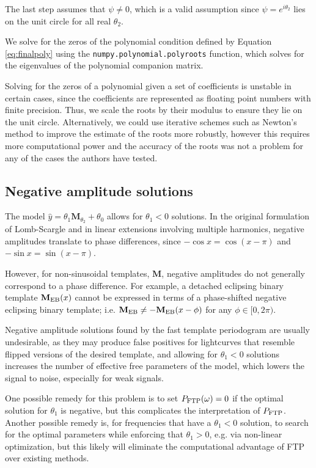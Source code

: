 \documentclass{aastex62}
\newcommand{\Mshft}{\mathbf{M}_{\theta_2}}
\newcommand{\eith}{\psi}
\begin{document}
The last step assumes that $\eith\ne 0$, which is a valid assumption since $\eith=e^{i\theta_2}$ lies on the
unit circle for all real $\theta_2$.

We solve for the zeros of the polynomial condition defined by Equation \ref{eq:finalpoly}
using the \texttt{numpy.polynomial.polyroots} function, which solves for the eigenvalues
of the polynomial companion matrix.

Solving for the zeros of a polynomial given a set of coefficients is unstable in certain cases, since the
coefficients are represented as floating point numbers with finite precision. Thus, we scale the roots
by their modulus to ensure they lie on the unit circle. Alternatively, we could use iterative schemes
such as Newton's method to improve the estimate of the roots more robustly, however this requires more computational power and
the accuracy of the roots was not a problem for any of the cases the authors have tested.


\subsection{Negative amplitude solutions}
The model $\hat{y}= \theta_1\Mshft + \theta_0$ allows for $\theta_1 < 0$ solutions.
In the original formulation of Lomb-Scargle and in linear
extensions involving multiple harmonics, negative amplitudes translate to
phase differences, since $-\cos{x} = \cos(x - \pi)$ and $-\sin{x} = \sin(x - \pi)$.

However, for non-sinusoidal templates, $\mathbf{M}$, negative amplitudes
do not generally correspond to a phase difference. For example, a
detached eclipsing binary template $\mathbf{M}_{\rm EB}(x)$ cannot be
expressed in terms of a phase-shifted negative eclipsing binary template; i.e.
$\mathbf{M}_{\rm EB} \neq - \mathbf{M}_{\rm EB}(x - \phi)$ for any $\phi\in[0, 2\pi)$.

Negative amplitude solutions found by the fast template periodogram are usually
undesirable, as they may produce false positives for lightcurves that resemble
flipped versions of the desired template, and allowing for $\theta_1 < 0$ solutions
increases the number of effective free parameters of the model, which lowers
the signal to noise, especially for weak signals.

One possible remedy for this problem is to set $P_{\rm FTP}(\omega) = 0$ if the optimal
solution for $\theta_1$ is negative, but this complicates the interpretation of $P_{\rm FTP}$.
Another possible remedy is, for frequencies that have a $\theta_1 < 0$ solution,
to search for the optimal parameters while enforcing that $\theta_1 > 0$,
e.g. via non-linear optimization, but this likely will eliminate the computational
advantage of FTP over existing methods.
\end{document}
